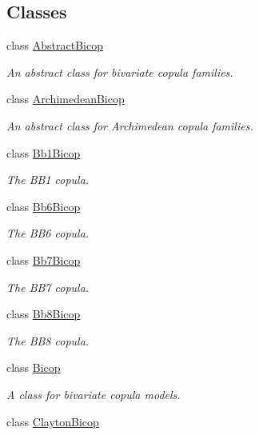 \subsection*{Classes}
\begin{DoxyCompactItemize}
\item 
class \hyperlink{classvinecopulib_1_1_abstract_bicop}{Abstract\+Bicop}
\begin{DoxyCompactList}\small\item\em An abstract class for bivariate copula families. \end{DoxyCompactList}\item 
class \hyperlink{classvinecopulib_1_1_archimedean_bicop}{Archimedean\+Bicop}
\begin{DoxyCompactList}\small\item\em An abstract class for Archimedean copula families. \end{DoxyCompactList}\item 
class \hyperlink{classvinecopulib_1_1_bb1_bicop}{Bb1\+Bicop}
\begin{DoxyCompactList}\small\item\em The B\+B1 copula. \end{DoxyCompactList}\item 
class \hyperlink{classvinecopulib_1_1_bb6_bicop}{Bb6\+Bicop}
\begin{DoxyCompactList}\small\item\em The B\+B6 copula. \end{DoxyCompactList}\item 
class \hyperlink{classvinecopulib_1_1_bb7_bicop}{Bb7\+Bicop}
\begin{DoxyCompactList}\small\item\em The B\+B7 copula. \end{DoxyCompactList}\item 
class \hyperlink{classvinecopulib_1_1_bb8_bicop}{Bb8\+Bicop}
\begin{DoxyCompactList}\small\item\em The B\+B8 copula. \end{DoxyCompactList}\item 
class \hyperlink{classvinecopulib_1_1_bicop}{Bicop}
\begin{DoxyCompactList}\small\item\em A class for bivariate copula models. \end{DoxyCompactList}\item 
class \hyperlink{classvinecopulib_1_1_clayton_bicop}{Clayton\+Bicop}

\end{DoxyCompactItemize}
